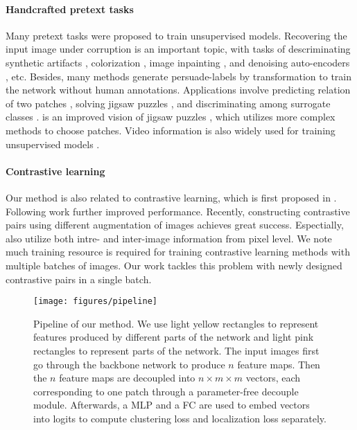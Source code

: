 \documentclass[final]{cvpr}
\begin{document}
\paragraph{Handcrafted pretext tasks} Many pretext tasks were proposed to train unsupervised models. Recovering the input image under corruption is an important topic, with tasks of descriminating synthetic artifacts \cite{spotartifacts}, colorization \cite{autocolor,colorization}, image inpainting \cite{inpainting}, and denoising auto-encoders \cite{denoiseautoencoder}, etc.
Besides, many methods generate persuade-labels by transformation to train the network without human annotations. Applications involve predicting relation of two patches \cite{contextpredict,transtive}, solving jigsaw puzzles \cite{jigpuz,damagedjigsaw}, and discriminating among surrogate classes \cite{exampler}. \cite{icbssl} is an improved vision of jigsaw puzzles \cite{jigpuz}, which utilizes more complex methods to choose patches.
Video information is also widely used for training unsupervised models \cite{moving,flowsimilarity,shufflelearn,watchmove}. 

\paragraph{Contrastive learning} Our method is also related to contrastive learning, which is first proposed in \cite{invariantmapping}. Following work \cite{dufec,npid,la,cmc} further improved performance. Recently, constructing contrastive pairs using different augmentation of images \cite{moco,simclr,pirl,sslhg} achieves great success. Espectially, \cite{sslhg} also utilize both intre- and inter-image information from pixel level. 
We note much training resource is required for training contrastive learning methods with multiple batches of images. Our work tackles this problem with newly designed contrastive pairs in a single batch.



\begin{figure*}
	\centering
	\texttt{[image: figures/pipeline]}
	\caption{Pipeline of our method. We use light yellow rectangles to represent features produced by different parts of the network and light pink rectangles to represent parts of the network. The input images first go through the backbone network to produce $n$ feature maps. Then the $n$ feature maps are decoupled into $n\times m\times m$ vectors, each corresponding to one patch through a parameter-free decouple module. Afterwards, a MLP and a FC are used to embed vectors into logits to compute clustering loss and localization loss separately. }
	\label{fig:pipeline}
\end{figure*}
\end{document}
